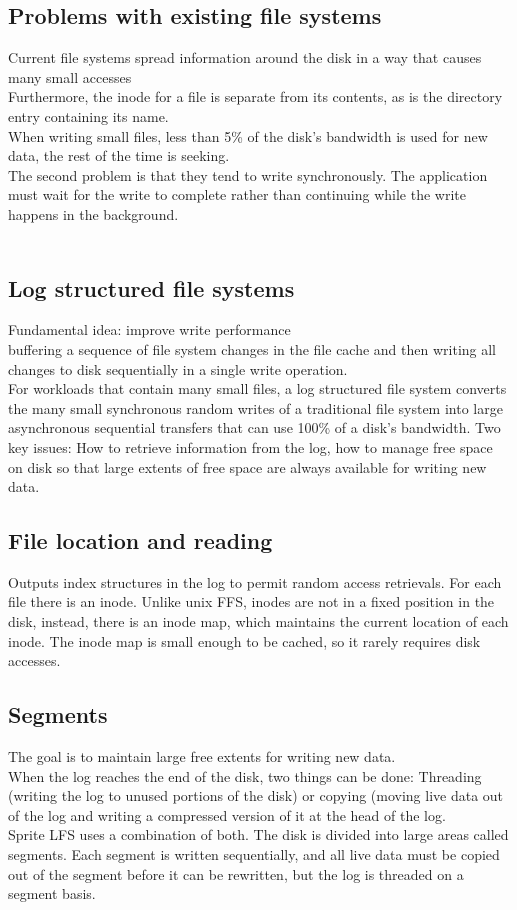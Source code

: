 \subsection{Problems with existing file systems}
Current file systems spread information around the disk in a way that causes many small accesses \\
Furthermore, the inode for a file is separate from its contents, as is the directory entry containing its name. \\
When writing small files, less than 5\% of the disk's bandwidth is used for new data, the rest of the time is seeking.\\
The second problem is that they tend to write synchronously. The application must wait for the write to complete rather than continuing while the write happens in the background.
\\
\\
\subsection{Log structured file systems}
Fundamental idea: improve write performance \\
buffering a sequence of file system changes in the file cache and then writing all changes to disk sequentially in a single write operation. \\
For workloads that contain many small files, a log structured file system converts the many small synchronous random writes of a traditional file system into large asynchronous sequential transfers that can use 100\% of a disk's bandwidth.
Two key issues: How to retrieve information from the log, how to manage free space on disk so that large extents of free space are always available for writing new data.
\subsection{File location and reading}
Outputs index structures in the log to permit random access retrievals. For each file there is an inode. Unlike unix FFS, inodes are not in a fixed position in the disk, instead, there is an inode map, which maintains the current location of each inode. The inode map is small enough to be cached, so it rarely requires disk accesses.
\subsection{Segments}
The goal is to maintain large free extents for writing new data. \\
When the log reaches the end of the disk, two things can be done: Threading (writing the log to unused portions of the disk) or copying (moving live data out of the log and writing a compressed version of it at the head of the log. \\
Sprite LFS uses a combination of both. The disk is divided into large areas called segments. Each segment is written sequentially, and all live data must be copied out of the segment before it can be rewritten, but the log is threaded on a segment basis.
